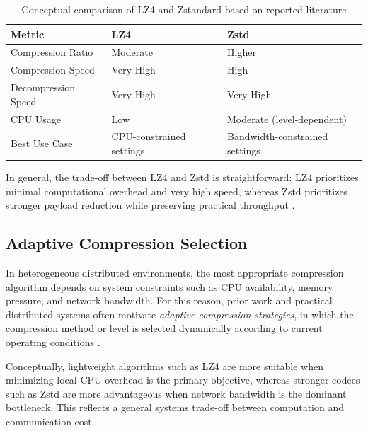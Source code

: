 \begin{table}[H]
    \centering
    \begin{tabular}{|p{}|p{}|p{}|}
        \hline
        \textbf{Metric} & \textbf{LZ4} & \textbf{Zstd} \\
        \hline
        Compression Ratio & Moderate & Higher \\
        \hline
        Compression Speed & Very High & High \\
        \hline
        Decompression Speed & Very High & Very High \\
        \hline
        CPU Usage & Low & Moderate (level-dependent) \\
        \hline
        Best Use Case & CPU-constrained settings & Bandwidth-constrained settings \\
        \hline
    \end{tabular}
    \caption{Conceptual comparison of LZ4 and Zstandard based on reported literature}
    \label{tab:compression_comparison}
\end{table}

In general, the trade-off between LZ4 and Zstd is straightforward: LZ4 prioritizes
minimal computational overhead and very high speed, whereas Zstd prioritizes stronger
payload reduction while preserving practical throughput
\cite{lz4_reference, collet2018zstandard}.

\subsection{Adaptive Compression Selection}
\label{subsec:compression_adaptive}

In heterogeneous distributed environments, the most appropriate compression algorithm
depends on system constraints such as CPU availability, memory pressure, and network
bandwidth. For this reason, prior work and practical distributed systems often motivate
\emph{adaptive compression strategies}, in which the compression method or level is
selected dynamically according to current operating conditions
\cite{collet2018zstandard, konevcny2016federated, kairouz2021advances}.

Conceptually, lightweight algorithms such as LZ4 are more suitable when minimizing
local CPU overhead is the primary objective, whereas stronger codecs such as Zstd are
more advantageous when network bandwidth is the dominant bottleneck. This reflects a
general systems trade-off between computation and communication cost.
